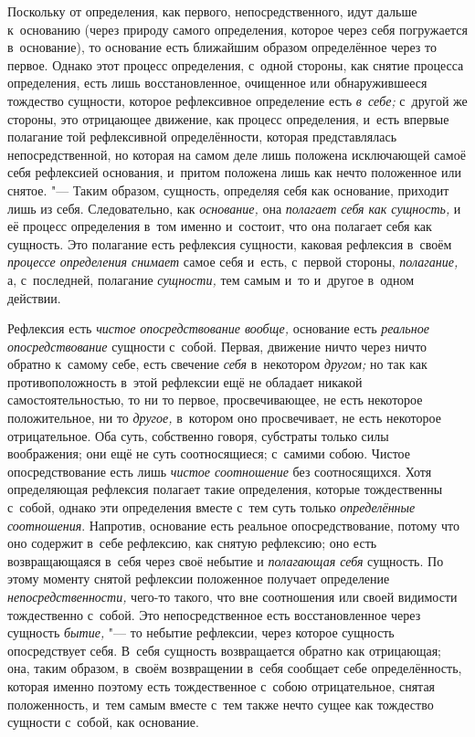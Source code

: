 Поскольку от определения, как первого, непосредственного, идут дальше
к~основанию (через природу самого определения, которое через себя погружается
в~основание), то основание есть ближайшим образом определённое через то первое.
Однако этот процесс определения, с~одной стороны, как снятие процесса
определения, есть лишь восстановленное, очищенное или обнаружившееся тождество
сущности, которое рефлексивное определение есть {\em в~себе;} с~другой же
стороны, это отрицающее движение, как процесс определения, и~есть впервые
полагание той рефлексивной определённости, которая представлялась
непосредственной, но которая на самом деле лишь положена исключающей самоё себя
рефлексией основания, и~притом положена лишь как нечто положенное или снятое.
"--- Таким образом, сущность, определяя себя как основание, приходит лишь из
себя. Следовательно, как {\em основание,} она {\em полагает себя как сущность,}
и её процесс определения в~том именно и~состоит, что она полагает себя как
сущность. Это полагание есть рефлексия сущности, каковая рефлексия в~своём
{\em процессе определения снимает} самое себя и~есть, с~первой стороны,
{\em полагание,} а, с~последней, полагание {\em сущности,} тем самым
и~то и~другое в~одном действии.

Рефлексия есть {\em чистое опосредствование вообще,} основание есть
{\em реальное опосредствование} сущности с~собой. Первая, движение ничто через
ничто обратно к~самому себе, есть свечение {\em себя} в~некотором {\em другом;}
но так как противоположность в~этой рефлексии ещё не обладает никакой
самостоятельностью, то ни то первое, просвечивающее, не есть некоторое
положительное, ни то {\em другое,} в~котором оно просвечивает, не есть
некоторое отрицательное. Оба суть, собственно говоря, субстраты только силы
воображения; они ещё не суть соотносящиеся; с~самими собою. Чистое
опосредствование есть лишь {\em чистое соотношение} без соотносящихся. Хотя
определяющая рефлексия полагает такие определения, которые тождественны
с~собой, однако эти определения вместе с~тем суть только {\em определённые
соотношения}. Напротив, основание есть реальное опосредствование, потому что
оно содержит в~себе рефлексию, как снятую рефлексию; оно есть возвращающаяся
в~себя через своё небытие и {\em полагающая себя} сущность. По этому моменту
снятой рефлексии положенное получает определение {\em непосредственности,}
чего-то такого, что вне соотношения или своей видимости тождественно с~собой.
Это непосредственное есть восстановленное через сущность {\em бытие,} "--- то
небытие рефлексии, через которое сущность опосредствует себя. В~себя сущность
возвращается обратно как отрицающая; она, таким образом, в~своём возвращении
в~себя сообщает себе определённость, которая именно поэтому есть тождественное
с~собою отрицательное, снятая положенность, и~тем самым вместе с~тем также
нечто сущее как тождество сущности с~собой, как основание.

